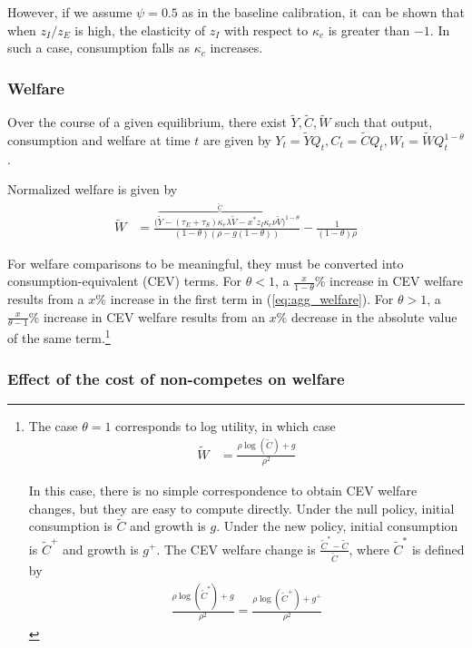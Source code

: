 \documentclass[11pt,english]{article}
\theoremstyle{remark}
\begin{document}
However, if we assume $\psi = 0.5$ as in the baseline calibration, it can be shown that when $z_I / z_E$ is high, the elasticity of $z_I$ with respect to $\kappa_c$ is greater than $-1$. In such a case, consumption falls as $\kappa_c$ increases. 

\subsubsection{Welfare}

Over the course of a given equilibrium, there exist $\tilde{Y},\tilde{C},\tilde{W}$ such that output, consumption and welfare at time $t$ are given by $Y_t = \tilde{Y} Q_t, C_t = \tilde{C} Q_t, W_t = \tilde{W} Q_t^{1-\theta}$. 

Normalized welfare is given by 
\begin{align}
\tilde{W} &= \frac{\big(\overbrace{\tilde{Y} - (\tau_E + \tau_S) \kappa_{e} \lambda \tilde{V} - x^* z_I \kappa_c \nu \tilde{V}}^{\tilde{C}}\big)^{1-\theta}}{(1-\theta)(\rho - g(1-\theta))} - \frac{1}{(1-\theta)\rho}  \label{eq:agg_welfare}
\end{align}


For welfare comparisons to be meaningful, they must be converted into consumption-equivalent (CEV) terms. For $\theta < 1$, a $\frac{x}{1-\theta}\%$ increase in CEV welfare results from a $x\%$ increase in the first term in (\ref{eq:agg_welfare}). For $\theta > 1$, a $\frac{x}{\theta-1}\%$ increase in CEV welfare results from an $x\%$ decrease in the absolute value of the same term.\footnote{The case $\theta = 1$ corresponds to log utility, in which case
	\begin{align}
	\tilde{W} &= \frac{\rho \log(\tilde{C}) + g}{\rho^2} \label{eq:agg_welfare_log}
	\end{align}
	
	In this case, there is no simple correspondence to obtain CEV welfare changes, but they are easy to compute directly. Under the null policy, initial consumption is $\tilde{C}$ and growth is $g$. Under the new policy, initial consumption is $\tilde{C}^+$ and growth is $g^+$. The CEV welfare change is $\frac{\tilde{C}^* - \tilde{C}}{\tilde{C}}$, where $\tilde{C}^*$ is defined by 
	\begin{align}
	\frac{\rho\log(\tilde{C}^*) + g}{\rho^2} = \frac{\rho \log(\tilde{C}^+) + g^+}{\rho^2} \label{eq:agg_welfare_log_CEV}
	\end{align}}

\subsubsection{Effect of the cost of non-competes on welfare}
\end{document}
